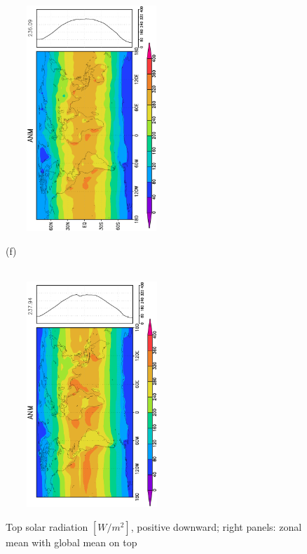 \documentclass[12pt,a4paper,twoside,openright,headinclude,liststotoc,bibtotoc]{scrreprt}
\begin{document}
\begin{figure}[H]
{\includegraphics[height=8.5cm,width=6.5cm,angle=-90]
{eps/zonaltmsolrad178.eps}
}
\parbox{8.5cm}{\hspace{0.48cm}\begin{scriptsize}(f)\end{scriptsize} \vspace{-0.7cm} \\
\includegraphics[height=8.5cm,width=6.5cm,angle=-90]
{eps/zonalt21tmsolrad.eps}
}
\caption[Top solar radiation]{Top solar radiation $[W/m^2]$, positive downward; right panels: zonal mean with global mean on top}
\label{img:solrad}
\end{figure}
\end{document}
